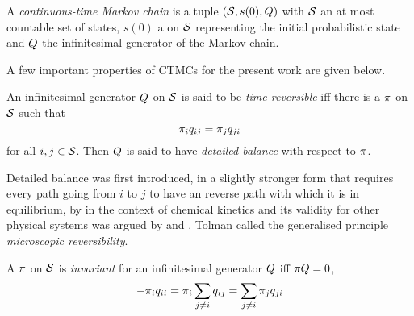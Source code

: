 \begin{definition}[CTMC]%
  A \emph{continuous-time Markov chain} is a tuple
  $\left(\mathcal{S}, s(0), Q\right)$ with
  $\mathcal{S}$ an at most countable set of states,
  $s(0)$ a \pmf on $\mathcal{S}$
  representing the initial probabilistic state and
  $Q$ the infinitesimal generator of the Markov chain.
\end{definition}

A few important properties of CTMCs
for the present work are given below.

\begin{definition}
  An infinitesimal generator $Q$ on $\mathcal{S}$
  is said to be \emph{time reversible} iff
  there is a \pmf $\pi$ on $\mathcal{S}$ such that
  \begin{equation}
    \label{eq:detailed-balance}
    \pi_i q_{ij} = \pi_j q_{ji}
  \end{equation}
  for all $i,j \in \mathcal{S}$.
  Then $Q$ is said to have \emph{detailed balance}
  with respect to $\pi$.
\end{definition}

Detailed balance was first introduced,
in a slightly stronger form
that requires every path going from $i$ to $j$
to have an reverse path with which it is in equilibrium,
by \citet{wegscheider} in the context of chemical kinetics
and its validity for other physical systems was argued by
\citet{lewis} and \citet{tolman}.
Tolman called the generalised principle
\emph{microscopic reversibility}. %

\begin{definition}
  A \pmf $\pi$ on $\mathcal{S}$ is
  \emph{invariant} for an infinitesimal generator $Q$
  iff $\pi Q = 0$, \ie
  \[ -\pi_i q_{ii} = \pi_i \sum_{j \neq i} q_{ij}
                  = \sum_{j \neq i} \pi_j q_{ji} \]
\end{definition}

